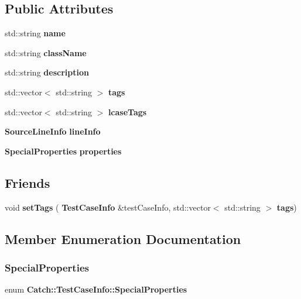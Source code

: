 \subsection*{Public Attributes}
\begin{DoxyCompactItemize}
\item 
std\+::string \textbf{ name}
\item 
std\+::string \textbf{ class\+Name}
\item 
std\+::string \textbf{ description}
\item 
std\+::vector$<$ std\+::string $>$ \textbf{ tags}
\item 
std\+::vector$<$ std\+::string $>$ \textbf{ lcase\+Tags}
\item 
\textbf{ Source\+Line\+Info} \textbf{ line\+Info}
\item 
\textbf{ Special\+Properties} \textbf{ properties}
\end{DoxyCompactItemize}
\subsection*{Friends}
\begin{DoxyCompactItemize}
\item 
void \textbf{ set\+Tags} (\textbf{ Test\+Case\+Info} \&test\+Case\+Info, std\+::vector$<$ std\+::string $>$ \textbf{ tags})
\end{DoxyCompactItemize}


\subsection{Member Enumeration Documentation}
\mbox{\label{struct_catch_1_1_test_case_info_a39b232f74b4a7a6f2183b96759027eac}} 
\subsubsection{SpecialProperties}
{\footnotesize\ttfamily enum \textbf{ Catch\+::\+Test\+Case\+Info\+::\+Special\+Properties}}

